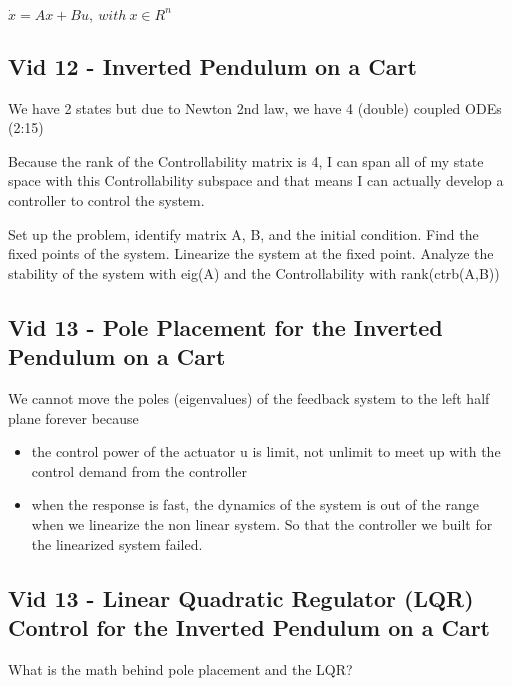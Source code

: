 $\dot{x} = Ax + Bu, ~with~ x\in R^n$ \\

\subsection{Vid 12 - Inverted Pendulum on a Cart}
We have 2 states but due to Newton 2nd law, we have 4 (double) coupled ODEs (2:15)


Because the rank of the Controllability matrix is 4,
I can span all of my state space with this Controllability subspace and that means
I can actually develop a controller to control the system.


Set up the problem, identify matrix A, B, and the initial condition.
Find the fixed points of the system.
Linearize the system at the fixed point.
Analyze the stability of the system with eig(A) and the Controllability with rank(ctrb(A,B))

\subsection{Vid 13 - Pole Placement for the Inverted Pendulum on a Cart}
We cannot move the poles (eigenvalues) of the feedback system to the left half plane forever
because
\begin{itemize}
	\item 	the control power of the actuator u is limit, 
			not unlimit to meet up with the control demand from the controller
	\item 	when the response is fast, the dynamics of the system is out of the range
			when we linearize the non linear system. So that the controller we built
            for the linearized system failed.			
\end{itemize}

\subsection{Vid 13 - Linear Quadratic Regulator (LQR) Control for the Inverted Pendulum on a Cart}

What is the math behind pole placement and the LQR?
